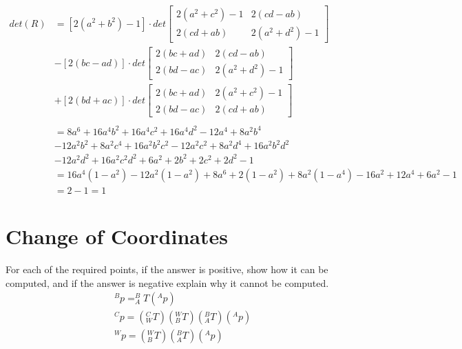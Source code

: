 \documentclass[12pt,letterpaper]{article}
\begin{document}
$$
    \begin{aligned}
        det(R) & =
        [2(a^{2} + b^{2}) - 1] \cdot det
        \begin{bmatrix}
            2(a^{2} + c^{2}) - 1 & 2(cd - ab)
            \\
            2(cd + ab) & 2(a^{2} + d^{2}) -1
        \end{bmatrix}
        \\
        & - [2(bc - ad)] \cdot det
        \begin{bmatrix}
            2(bc + ad) & 2(cd - ab)
            \\
            2(bd - ac) & 2(a^{2} + d^{2}) -1
        \end{bmatrix}
        \\
        & + [2(bd + ac)] \cdot det
        \begin{bmatrix}
            2(bc + ad) & 2(a^{2} + c^{2}) - 1
            \\
            2(bd - ac) & 2(cd + ab)
        \end{bmatrix}
        \\\\
        & = 8a^{6} + 16a^{4}b^{2} + 16a^{4}c^{2} + 16a^{4}d^{2} - 12a^{4} + 8a^{2}b^{4}
        \\
        & - 12a^{2}b^{2} + 8a^2c^{4} + 16a^{2}b^{2}c^{2} - 12a^{2}c^{2}+8a^{2}d^{4} + 16a^{2}b^{2}d^{2}
        \\
        & - 12a^{2}d^{2} + 16a^{2}c^{2}d^{2} + 6a^{2} + 2b^{2} + 2c^{2} + 2d^{2} -1
        \\
        & = 16a^{4}(1 - a^{2}) - 12a^{2}(1 - a^2) + 8a^{6} + 2(1 - a^{2}) + 8a^{2}(1 - a^{4}) - 16a^{2} + 12a^{4} + 6a^{2} - 1
        \\
        & = 2 - 1 = 1
    \end{aligned}
$$

\section{Change of Coordinates}

For each of the required points, if the answer
is positive, show how it can be computed, and if the answer is negative explain why it cannot be
computed.
$$
    \begin{aligned}
        & ^{B}p = ^{B}_{A}T(^{A}p)
        \\
        & ^{C}p = (^{C}_{W}T) (^{W}_{B}T) (^{B}_{A}T)(^{A}p)
        \\
        & ^{W}p = (^{W}_{B}T) (^{B}_{A}T)(^{A}p)
    \end{aligned}
$$
\end{document}
